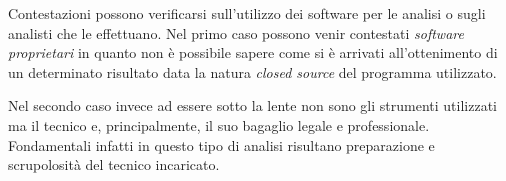Contestazioni possono verificarsi sull'utilizzo dei software per le analisi o sugli analisti che le effettuano. Nel primo caso possono venir contestati \textit{software proprietari} in quanto non è possibile sapere come si è arrivati all'ottenimento di un determinato risultato data la natura \textit{closed source} del programma utilizzato. 

Nel secondo caso invece ad essere sotto la lente non sono gli strumenti utilizzati ma il tecnico e, principalmente, il suo bagaglio legale e professionale. Fondamentali infatti in questo tipo di analisi risultano preparazione e scrupolosità del tecnico incaricato. 
